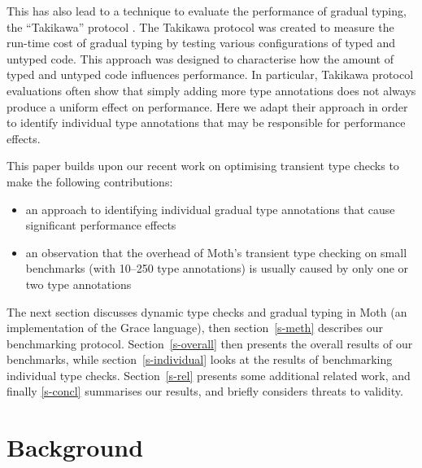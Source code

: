 \documentclass[sigplan,screen]{acmart}
\begin{document}
This has also lead to a technique to evaluate the performance of gradual typing, the ``Takikawa'' protocol \cite{Takikawa2016,Greenman2019jfp,vitousek-transient-arXive-2019}. The Takikawa protocol was created to measure the run-time cost of gradual typing by testing various configurations of typed and untyped code. This approach was designed to characterise how the amount of typed and untyped code influences performance.
In particular, Takikawa protocol evaluations often show that simply adding more type annotations does not always produce a uniform effect on performance. Here we adapt their approach in order to identify individual type annotations that may be responsible for performance effects.

This paper builds upon our recent work on optimising transient type checks \cite{Roberts2017,roberts-and-co-ecoop-2019} to make the following contributions:
\begin{itemize}
  \item an approach to identifying individual gradual type annotations
        that cause significant performance effects
  \item an observation that the overhead of Moth's transient type checking on small benchmarks (with 10--250 type annotations) is usually caused by only one or two type annotations
\end{itemize}


The next section discusses dynamic type checks and gradual typing in
Moth (an implementation of the Grace language), then section~\ref{s-meth} describes our benchmarking protocol. Section~\ref{s-overall} then presents the overall results of
our benchmarks, while section~\ref{s-individual}
looks at the results of benchmarking individual type checks.
Section~\ref{s-rel} presents some additional related work, and finally \ref{s-concl} summarises our results, and briefly considers threats to validity.

\section{Background}
\label{s-bg}
\end{document}
